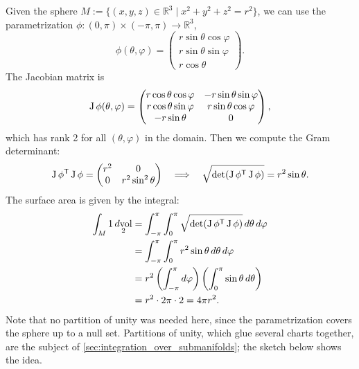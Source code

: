\begin{example}
\label{ex:surface_area_sphere}
Given the sphere $M := \{(x,y,z) \in \mathbb{R}^3 \mid x^2+y^2+z^2 = r^2\}$, we can use the parametrization $\phi : (0,\pi) \times (-\pi,\pi) \to \mathbb{R}^3$,
\[\phi(\theta,\varphi) = \begin{pmatrix} r\sin\theta\cos\varphi \\ r\sin\theta\sin\varphi \\ r\cos\theta \end{pmatrix}.\]
The Jacobian matrix is
\[\operatorname{J}\phi(\theta,\varphi) = \begin{pmatrix} r\cos\theta\cos\varphi & -r\sin\theta\sin\varphi \\ r\cos\theta\sin\varphi & r\sin\theta\cos\varphi \\ -r\sin\theta & 0 \end{pmatrix},\]
which has rank 2 for all $(\theta,\varphi)$ in the domain.
Then we compute the Gram determinant:
\[\operatorname{J}\phi^{\mathsf{T}} \operatorname{J}\phi = \begin{pmatrix} r^2 & 0 \\ 0 & r^2\sin^2\theta \end{pmatrix} \quad \Longrightarrow \quad \sqrt{\det(\operatorname{J}\phi^{\mathsf{T}} \operatorname{J}\phi)} = r^2\sin\theta.\]
The surface area is given by the integral:
\begin{align*}
\int_M 1 \mathop{d\text{vol}}_2 &= \int_{-\pi}^\pi \int_0^\pi \sqrt{\det(\operatorname{J}\phi^{\mathsf{T}} \operatorname{J}\phi)} \,d\theta\,d\varphi \\
&= \int_{-\pi}^\pi \int_0^\pi r^2\sin\theta \,d\theta\,d\varphi \\
&= r^2 \left(\int_{-\pi}^\pi d\varphi\right) \left(\int_0^\pi \sin\theta \,d\theta\right) \\
&= r^2 \cdot 2\pi \cdot 2 = 4\pi r^2.
\end{align*}
Note that no partition of unity was needed here, since the parametrization covers the sphere up
to a null set. Partitions of unity, which glue several charts together, are the subject of
\cref{sec:integration_over_submanifolds}; the sketch below shows the idea.

\begin{center}
\end{center}
\end{example}
